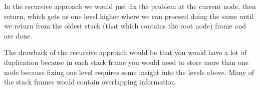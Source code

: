 \documentclass[12pt, a4paper]{article}
\begin{document}
In the recursive approach we would just fix the problem at the current node, then return, which gets us one level higher where we can proceed doing the same until we return from the oldest stack (that which contains the root node) frame and are done.

The drawback of the recursive approach would be that you would have a lot of duplication because in each stack frame you would need to store more than one node because fixing one level requires some insight into the levels above. Many of the stack frames would contain overlapping information.

\section{} %
\end{document}
